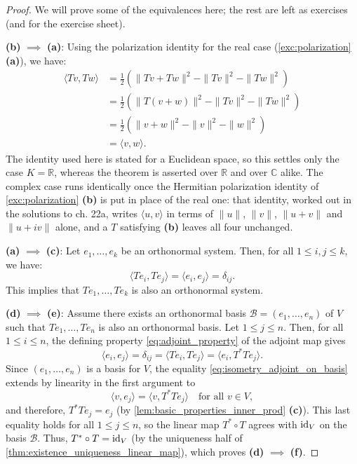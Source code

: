 \begin{proof}
We will prove some of the equivalences here; the rest are left as exercises (and for the exercise sheet).

\textbf{(b)} $\implies$ \textbf{(a)}: Using the polarization identity for the real case (\cref{exc:polarization} \textbf{(a)}), we have:
\begin{align*}
    \langle Tv, Tw \rangle &= \frac{1}{2} \left( \|Tv + Tw\|^2 - \|Tv\|^2 - \|Tw\|^2 \right) \\
    &= \frac{1}{2} \left( \|T(v + w)\|^2 - \|Tv\|^2 - \|Tw\|^2 \right) \\
    &= \frac{1}{2} \left( \|v + w\|^2 - \|v\|^2 - \|w\|^2 \right) \\
    &= \langle v, w \rangle.
\end{align*}
The identity used here is stated for a Euclidean space, so this settles only the case $K = \mathbb{R}$, whereas the theorem is asserted over $\mathbb{R}$ and over $\mathbb{C}$ alike. The complex case runs identically once the Hermitian polarization identity of \cref{exc:polarization} \textbf{(b)} is put in place of the real one: that identity, worked out in the solutions to ch. 22a, writes $\langle u, v \rangle$ in terms of $\|u\|$, $\|v\|$, $\|u+v\|$ and $\|u+iv\|$ alone, and a $T$ satisfying \textbf{(b)} leaves all four unchanged.

\textbf{(a)} $\implies$ \textbf{(c)}: Let $e_1, \dots, e_k$ be an orthonormal system. Then, for all $1 \leq i, j \leq k$, we have:
\[ \langle Te_i, Te_j \rangle = \langle e_i, e_j \rangle = \delta_{ij}. \]
This implies that $Te_1, \dots, Te_k$ is also an orthonormal system.

\textbf{(d)} $\implies$ \textbf{(e)}: Assume there exists an orthonormal basis $\mathcal{B} = (e_1, \dots, e_n)$ of $V$ such that $Te_1, \dots, Te_n$ is also an orthonormal basis. Let $1 \leq j \leq n$. Then, for all $1 \leq i \leq n$, the defining property \eqref{eq:adjoint_property} of the adjoint map gives
\begin{equation}
\label{eq:isometry_adjoint_on_basis}
    \langle e_i, e_j \rangle = \delta_{ij} = \langle Te_i, Te_j \rangle = \langle e_i, T^*Te_j \rangle.
\end{equation}
Since $(e_1, \dots, e_n)$ is a basis for $V$, the equality \eqref{eq:isometry_adjoint_on_basis} extends by linearity in the first argument to
\[ \langle v, e_j \rangle = \langle v, T^*Te_j \rangle \quad \text{for all } v \in V, \]
and therefore, $T^*Te_j = e_j$ (by \cref{lem:basic_properties_inner_prod} \textbf{(c)}). This last equality holds for all $1 \leq j \leq n$, so the linear map $T^* \circ T$ agrees with $\operatorname{id}_V$ on the basis $\mathcal{B}$. Thus, $T^* \circ T = \operatorname{id}_V$ (by the uniqueness half of \cref{thm:existence_uniqueness_linear_map}), which proves \textbf{(d)} $\implies$ \textbf{(f)}.


\end{proof}
